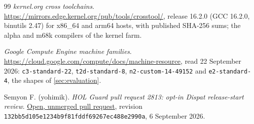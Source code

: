 \begin{thebibliography}{99}
\emph{kernel.org cross toolchains}. \url{https://mirrors.edge.kernel.org/pub/tools/crosstool/},
release 16.2.0 (GCC 16.2.0, binutils 2.47) for x86\_64 and arm64 hosts, with
published SHA-256 sums; the alpha and m68k compilers of the kernel farm.

\emph{Google Compute Engine machine families}.
\url{https://cloud.google.com/compute/docs/machine-resource}, read 22 September 2026:
\texttt{c3-standard-22}, \texttt{t2d-standard-8}, \texttt{n2-custom-14-49152}
and \texttt{e2-standard-4}, the shapes of \cref{sec:evaluation}.

Semyon F. (yohimik). \emph{HOL Guard pull request 2813: opt-in Dispat release-start
review}. \href{https://github.com/hashgraph-online/hol-guard/pull/2813}{Open,
unmerged pull request}, revision
\texttt{132bb5d105e1234b9f81fddf69267ec488e2990a}, 6 September 2026.

\end{thebibliography}
